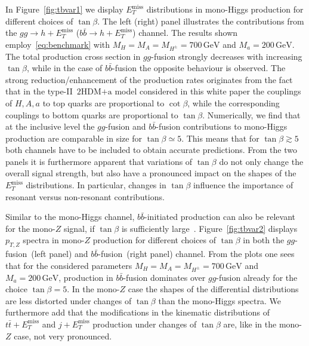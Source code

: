 \documentclass[review]{elsarticle}
\newcommand{\MET}{\ensuremath{E_T^\mathrm{miss}}\xspace}
\newcommand{\mA}{\ensuremath{M_{A}}\xspace}
\newcommand{\ma}{\ensuremath{M_{a}}\xspace}
\newcommand{\mH}{\ensuremath{M_{H}}\xspace}
\newcommand{\mHc}{\ensuremath{M_{H^{\pm}}}\xspace}
\newcommand{\hdma}{\ensuremath{\textrm{2HDM+a}}\xspace}
\begin{document}
In Figure~\ref{fig:tbvar1} we display $\MET$ distributions in mono-Higgs production for different choices of $\tan \beta$. The left (right) panel illustrates the contributions from the $gg \to h + \MET$ ($b \bar b \to h + \MET$) channel. The  results shown employ~\eqref{eq:benchmark} with $\mH = \mA = \mHc = 700 \, {\mathrm{GeV}}$ and $\ma = 200 \, {\mathrm{GeV}}$. The total production cross section in $gg$-fusion strongly decreases with increasing $\tan \beta$, while in the case of $b \bar b$-fusion the opposite behaviour is observed. The strong reduction/enhancement of the production rates originates from the fact that in  the type-II~\hdma model considered in this white paper the couplings of $H,A,a$ to top quarks are proportional to $\cot \beta$, while the corresponding couplings to bottom quarks are proportional to $\tan \beta$. Numerically, we find that at the inclusive level the $gg$-fusion and $b\bar b$-fusion contributions to mono-Higgs production are comparable in size for $\tan \beta \simeq 5$. This means that for $\tan \beta \gtrsim 5$ both channels have to be included to obtain accurate predictions. From the two panels it is furthermore apparent that variations of $\tan \beta$ do not only change the overall signal strength, but also have a pronounced impact on the shapes of the $\MET$ distributions. In particular, changes in $\tan \beta$ influence the importance of resonant versus non-resonant contributions. 

 Similar to the mono-Higgs channel, $b \bar b$-initiated production can also be relevant for the mono-$Z$ signal,  if $\tan \beta$ is sufficiently large~\cite{Bauer:2017ota}. Figure~\ref{fig:tbvar2} displays $p_{T,Z}$ spectra in mono-$Z$ production for different choices of $\tan \beta$ in both the $gg$-fusion~(left panel) and $b \bar b$-fusion~(right panel) channel.  From the plots one sees that for the considered parameters $\mH = \mA = \mHc = 700 \, {\mathrm{GeV}}$ and $\ma = 200 \, {\mathrm{GeV}}$,  production in $b \bar b$-fusion dominates over $gg$-fusion already for the choice $\tan \beta = 5$. In the mono-$Z$ case   the shapes of the differential distributions are less distorted under changes of $\tan \beta$ than the mono-Higgs spectra. We furthermore  add that the modifications in the kinematic distributions of $t \bar t + \MET$ and $j +\MET$ production under changes of $\tan \beta$ are, like in the mono-$Z$ case, not very pronounced.
 
\end{document}

